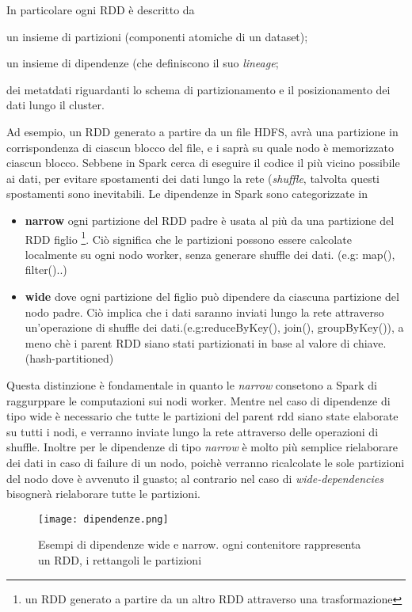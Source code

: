 In particolare   ogni RDD è descritto da  
\begin{inlinelist}
  \item un insieme di partizioni (componenti atomiche di un dataset);
  \item un insieme di dipendenze (che definiscono il suo \emph{lineage};
  \item dei metatdati riguardanti lo schema di partizionamento e il posizionamento dei dati lungo il cluster.
\end{inlinelist}
Ad esempio, un RDD generato a partire da un file HDFS, avrà una partizione  in corrispondenza di ciascun blocco del file, e i saprà su quale nodo è memorizzato ciascun blocco.
Sebbene in Spark  cerca di eseguire il codice il più vicino possibile ai dati, per evitare spostamenti dei dati lungo la rete (\emph{shuffle}, talvolta questi spostamenti sono inevitabili.
Le dipendenze in Spark  sono categorizzate in
\begin{itemize}
\item \textbf{narrow}  
ogni partizione del RDD padre è usata al più da una partizione del RDD figlio \footnote{un RDD generato a partire da un altro RDD attraverso una trasformazione}. Ciò significa che le partizioni possono essere calcolate localmente su ogni nodo worker, senza generare shuffle dei dati. (e.g: map(), filter()..) 
 \item \textbf{wide}  dove ogni partizione del figlio può dipendere da ciascuna partizione del nodo padre. Ciò implica che i dati saranno inviati lungo la rete attraverso un'operazione di shuffle dei dati.(e.g:reduceByKey(), join(), groupByKey()), a meno chè i parent RDD siano stati partizionati in base al valore di chiave.(hash-partitioned)
\end{itemize}

  
Questa distinzione è fondamentale in quanto le \emph{narrow} consetono a Spark di raggurppare le computazioni sui nodi worker.
Mentre nel caso di dipendenze di tipo wide è necessario che tutte le partizioni del parent rdd siano state elaborate su tutti i nodi, e verranno inviate lungo la rete attraverso delle operazioni di shuffle.
Inoltre per le dipendenze di tipo \emph{narrow} è molto più semplice rielaborare dei dati in caso di failure di un nodo, poichè verranno ricalcolate le sole partizioni del nodo dove è avvenuto il guasto; al contrario nel caso di \emph{wide-dependencies} bisognerà rielaborare tutte le partizioni.
 
 
 
 \begin{figure}[h]
\centering
\texttt{[image: dipendenze.png]}
\caption{Esempi di dipendenze wide e narrow. ogni contenitore rappresenta un RDD, i rettangoli le partizioni}
\label{fig:sparkDependencies}
\end{figure} 

